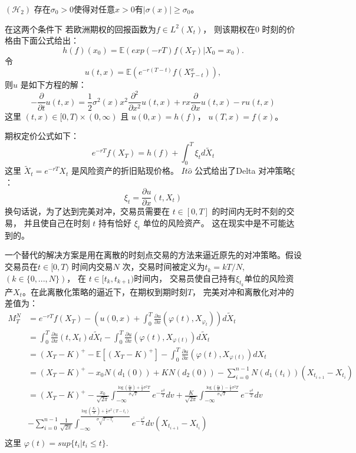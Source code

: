 $(\mathcal{H}_2)$ 存在$\sigma_0>0$使得对任意$x>0$有$|\sigma(x)|\geq \sigma_0$。

在这两个条件下
若欧洲期权的回报函数为$f\in L^2(X_t)$， 则该期权在$0$ 时刻的价格由下面公式给出：
\begin{equation}
h(f)(x_0)=\mathbb{E}(exp(-rT)f(X_T)|X_0=x_0).
\end{equation}
令
\begin{equation}
u(t, x)=\mathbb{E}(e^{-r(T-t)}f(X_{T-t}^x)),
\end{equation}
则$u$ 是如下方程的解：
\begin{equation}
-\frac{\partial}{\partial t}u(t, x) =\frac{1}{2}\sigma^2(x)x^2\frac{\partial^2}{\partial x^2}u(t,x)+rx\frac{\partial}{\partial x}u(t,x)-ru(t,x)
\end{equation}
这里 $(t,x)\in [0,T)\times (0,\infty)$ 且 $u(0,x)=h(f)$，  $u(T,x)=f(x)$。

期权定价公式如下：
\begin{equation}
e^{-rT}f(X_T)=h(f)+\int_0^T \xi_t d\widetilde{X}_t
\end{equation}
这里 $\widetilde{X}_t=e^{-rT}X_t$ 是风险资产的折旧贴现价格。 
$It\hat{o}$ 公式给出了Delta 对冲策略$\xi$： 
\begin{equation}
\xi_t=\frac{\partial u}{\partial x}(t, X_t)
\end{equation}
换句话说，为了达到完美对冲，交易员需要在 
$t\in [0, T]$ 的时间内无时不刻的交易， 并且使自己在时刻 $t$ 持有恰好 $\xi_t$ 单位的风险资产。 
这在现实中是不可能达到的。

一个替代的解决方案是用在离散的时刻点交易的方法来逼近原先的对冲策略。假设交易员在$t\in[0, T)$
时间内交易$N$ 次，交易时间被定义为$t_k=kT/N$, $(k\in \{0,...,N\})$， 在 $t\in [t_k, t_{k+1})$时间内，
交易员使自己持有$\xi_{t_k}$单位的风险资产$X_t$。在此离散化策略的逼近下，在期权到期时刻$T$， 
完美对冲和离散化对冲的差值为：
\begin{equation}
\begin{split}
M_T^N
&=e^{-rT}f(X_T)-(u(0,x)+\int_0^T\frac{\partial u}{\partial x}(\varphi(t), 
X_{\varphi_t}))d\widetilde{X}_t\\
&=\int_0^T\frac{\partial u}{\partial x}(t, X_t)d\widetilde{X}_t-\int_0^T\frac{\partial u}{\partial x}(\varphi(t), X_{\varphi(t)})d\widetilde{X}_t\\
&=(X_T-K)^+-\mathbb{E}[(X_T-K)^+]-\int_0^T\frac{\partial u}{\partial x}(\varphi(t), X_{\varphi(t)})dX_t\\
&=(X_T-K)^+-x_0N(d_1(0))+KN(d_2(0))-\sum_{i=0}^{n-1}N(d_1(t_i))(X_{t_{i+1}}-X_{t_i})\\
&=(X_T-K)^+-\frac{x_0}{\sqrt{2\pi}}\int_{-\infty}^{\frac{\log(\frac{x_0}{K})+\frac{1}{2}\sigma^2T}
{\sigma\sqrt{T}}}e^{-\frac{v^2}{2}}dv+\frac{K}{\sqrt{2\pi}}\int_{-\infty}^{\frac{\log(\frac{x_0}{K})-\frac{1}{2}\sigma^2T}{\sigma\sqrt{T}}}e^{-\frac{v^2}{2}}dv\\
&-\sum_{i=0}^{n-1}\frac{1}{\sqrt{2\pi}}\int_{-\infty}^{\frac{\log(\frac{X_{t_i}}{K})+\frac{1}{2}\sigma^2(T-t_i)}{\sigma\sqrt{T-t_i}}}e^{-\frac{v^2}{2}}dv(X_{t_{i+1}}-X_{t_i})\\
\end{split}
\end{equation}
这里 $\varphi(t)=sup\{t_i | t_i\leq t \}$.

